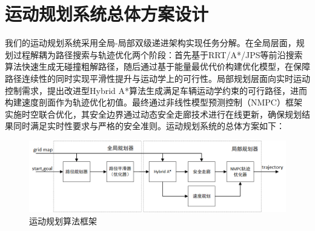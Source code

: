 \documentclass[master,academic]{ysuthesis} %
\begin{document}
	\section{运动规划系统总体方案设计}
	我们的运动规划系统采用全局-局部双级递进架构实现任务分解。在全局层面，规划过程解耦为路径搜索与轨迹优化两个阶段：首先基于RRT/A*/JPS等前沿搜索算法快速生成无碰撞粗解路径，随后通过基于能量最优代价构建优化模型，在保障路径连续性的同时实现平滑性提升与运动学上的可行性。局部规划层面向实时运动控制需求，提出改进型Hybrid A*算法生成满足车辆运动学约束的可行路径，进而构建速度剖面作为轨迹优化初值。最终通过非线性模型预测控制（NMPC）框架实施时空联合优化，其安全边界通过动态安全走廊技术进行在线更新，确保规划结果同时满足实时性要求与严格的安全准则。运动规划系统的总体方案如下：
		\begin{figure}[!ht]
			\centering
			\includegraphics[width=1.0\textwidth]{运动规划算法框架.png}
			\caption{运动规划算法框架}
			\label{fig:运动规划算法框架}
		\end{figure}
\end{document}
